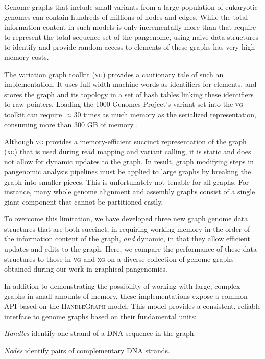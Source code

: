 \documentclass{article}
\begin{document}
Genome graphs that include small variants from a large population of eukaryotic genomes can contain hundreds of millions of nodes and edges.
While the total information content in such models is only incrementally more than that require to represent the total sequence set of the pangenome, using naive data structures to identify and provide random access to elements of these graphs has very high memory costs.

The variation graph toolkit (\textsc{vg}) \cite{Garrison_2018} provides a cautionary tale of such an implementation.
It uses full width machine words as identifiers for elements, and stores the graph and its topology in a set of hash tables linking these identifiers to raw pointers.
Loading the 1000 Genomes Project's variant set into the \textsc{vg} toolkit can require $\approx$30 times as much memory as the serialized representation, consuming more than 300 GB of memory \cite{Garrison_2019}.

Although \textsc{vg} provides a memory-efficient succinct representation of the graph (\textsc{xg}) that is used during read mapping and variant calling, it is static and does not allow for dynamic updates to the graph.
In result, graph modifying steps in pangenomic analysis pipelines must be applied to large graphs by breaking the graph into smaller pieces.
This is unfortunately not tenable for all graphs.
For instance, many whole genome alignment and assembly graphs consist of a single giant component that cannot be partitioned easily.

To overcome this limitation, we have developed three new graph genome data structures that are both succinct, in requiring working memory in the order of the information content of the graph, \emph{and} dynamic, in that they allow efficient updates and edits to the graph.
Here, we compare the performance of these data structures to those in \textsc{vg} and \textsc{xg} on a diverse collection of genome graphs obtained during our work in graphical pangenomics.

In addition to demonstrating the possibility of working with large, complex graphs in small amounts of memory, these implementations expose a common API based on the \textsc{HandleGraph} model.
This model provides a consistent, reliable interface to genome graphs based on their fundamental units:

\emph{Handles} identify one strand of a DNA sequence in the graph.

\emph{Nodes} identify pairs of complementary DNA strands.
\end{document}
